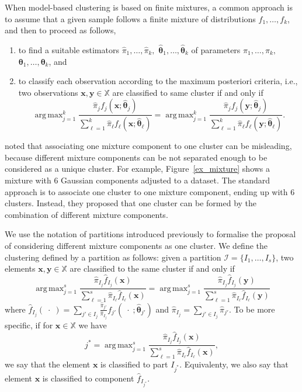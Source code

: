 \documentclass[10pt, a4paper]{article}
\DeclareMathOperator*{\argmax}{arg\,max}
\newcommand{\m}[1]{\boldsymbol{#1}}
\begin{document}
When model-based clustering is based on finite mixtures, a common approach is to assume that a given sample follows a finite mixture of distributions $f_1, \dots, f_k$, and then to proceed as follows,
\begin{enumerate}
\item to find a suitable estimators $\hat{\pi}_1, \dots, \hat{\pi}_k,$ $\hat{\m\theta}_1, \dots, \hat{\m\theta}_k$ of parameters $\pi_1, \dots, \pi_k,$ $\m\theta_1, \dots, \m\theta_k$, and
\item to classify each observation according to the maximum posteriori criteria, i.e., two observations $\m x, \m y \in \mathbb{X}$ are classified to same cluster if and only if
\[
\argmax_{j=1}^k \frac{ \hat{\pi}_j f_j(\m x ; \hat{\m\theta}_j) }{\sum_{\ell=1}^k \hat{\pi}_\ell f_\ell(\m x ; \hat{\m\theta}_\ell) } = \argmax_{j=1}^k \frac{ \hat{\pi}_j f_j(\m y ; \hat{\m\theta}_j) }{ \sum_{\ell=1}^k \hat{\pi}_\ell f_\ell(\m y ; \hat{\m\theta}_\ell) }.
\]
\end{enumerate}


\cite{lee2004combining,hennig2010methods,baudry2010combining,melnykov2013distribution,pastore2013merging} noted that associating one mixture component to one cluster can be misleading, because different mixture components can be not separated enough to be considered as a unique cluster. For example, Figure~\ref{ex_mixture} shows  a mixture with 6 Gaussian components adjusted to a dataset. The standard approach is to associate one cluster to one mixture component, ending up with 6 clusters. Instead, they proposed that one cluster can be formed by the combination of different mixture components.

We use the notation of partitions introduced previously to formalise the proposal of considering different mixture components as one cluster. We define the clustering defined by a partition as follows: given a partition $\mathcal{I} = \{ I_1, \dots, I_s\}$, two elements $\m x, \m y \in \mathbb{X}$ are classified to the same cluster if and only if
\begin{equation}\label{cluster_criteria}
\argmax_{j=1}^s \frac{ \hat{\pi}_{I_j} \hat{f}_{I_j}(\m x) }{\sum_{\ell=1}^s \hat{\pi}_{I_\ell} \hat{f}_{I_\ell}(\m x ) } = \argmax_{j=1}^s \frac{ \hat{\pi}_{I_j} \hat{f}_{I_j}(\m y) }{ \sum_{\ell=1}^s \hat{\pi}_{I_\ell} \hat{f}_{I_\ell}(\m y) }
\end{equation}
where $\hat{f}_{I_j}(\;\cdot\;) = \sum_{j' \in I_j} \frac{\hat{\pi}_{j'}}{\hat{\pi}_{I_j}} f_{j'}(\;\cdot\; ; \hat{\m\theta}_{j'})$ and $\hat{\pi}_{I_j} =  \sum_{j' \in I_j} \hat{\pi}_{j'}$. To be more specific,  if for $\m x \in \mathbb{X}$ we have
\[
j^* = \argmax_{j=1}^s \frac{ \hat{\pi}_{I_j} \hat{f}_{I_j}(\m x) }{\sum_{\ell=1}^s \hat{\pi}_{I_\ell} \hat{f}_{I_\ell}(\m x ) },
\]
we say that the element $\m x$ is classified to part $I_{j^*}$. Equivalenty, we also say that element $\m x$ is classified to component $\hat{f}_{I_{j^*}}$.
\end{document}
